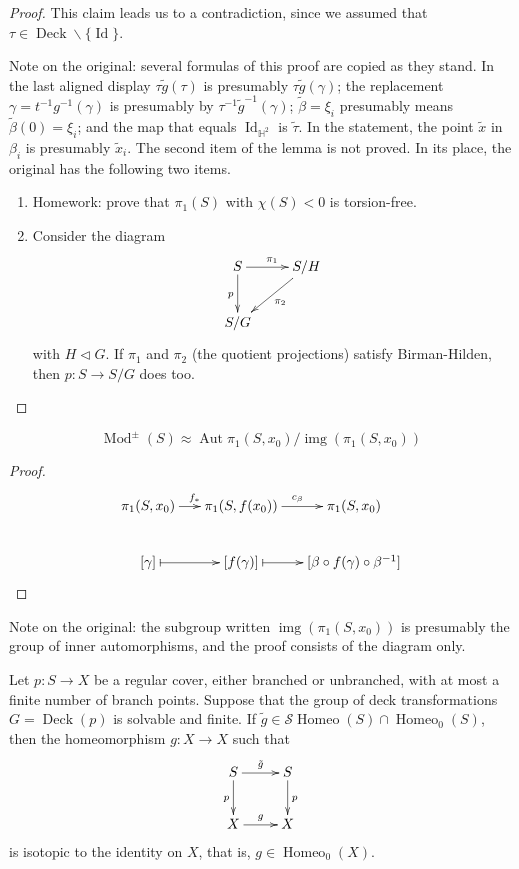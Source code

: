 \begin{proof}
This claim leads us to a contradiction,
since we assumed that
$\tau\in\operatorname{Deck}
\backslash\{\operatorname{Id}\}$.

Note on the original: several formulas
of this proof are copied as they stand.
In the last aligned display
$\tau\tilde{g}(\tau)$ is presumably
$\tau\tilde{g}(\gamma)$; the
replacement
$\gamma=t^{-1}g^{-1}(\gamma)$ is
presumably by
$\tau^{-1}\tilde{g}^{-1}(\gamma)$;
$\tilde{\beta}=\xi_i$ presumably means
$\tilde{\beta}(0)=\xi_i$; and the map
that equals
$\operatorname{Id}_{\mathbb{H}^2}$ is
$\tilde{\tau}$. In the statement, the
point $\tilde{x}$ in $\beta_i$ is
presumably $\tilde{x}_i$. The second
item of the lemma is not proved. In its
place, the original has the following
two items.
\begin{enumerate}
\item Homework: prove that $\pi_1(S)$
with $\chi(S)<0$ is torsion-free.
\item Consider the diagram
$$
\xymatrix{
S \ar[d]_{p} \ar[r]^{\pi_1}
  & S/H \ar[dl]^{\pi_2} \\
S/G
}
$$
with $H\triangleleft G$. If $\pi_1$ and
$\pi_2$ (the quotient projections)
satisfy Birman-Hilden, then
$p:S\to S/G$ does too.
\end{enumerate}
\end{proof}

\begin{theorem}
\label{theorem-dehn-nielsen-baer}
$$
\operatorname{Mod}^\pm(S)\approx
\operatorname{Aut}\pi_1(S,x_0)\Big/
\operatorname{img}(\pi_1(S,x_0))
$$
\end{theorem}

\begin{proof}
$$
\xymatrix@C=1.5em{
\pi_1(S,x_0) \ar[r]^{f_*}
  & \pi_1(S,f(x_0)) \ar[r]^{c_\beta}
  & \pi_1(S,x_0) \\
[\gamma] \ar@{|->}[r]
  & [f(\gamma)] \ar@{|->}[r]
  & [\beta\circ f(\gamma)
    \circ\beta^{-1}]
}
$$
\end{proof}

Note on the original: the subgroup
written
$\operatorname{img}(\pi_1(S,x_0))$ is
presumably the group of inner
automorphisms, and the proof consists
of the diagram only.

\begin{theorem}
\label{theorem-solvable-projects}
Let $p:S\to X$ be a regular cover,
either branched or unbranched, with at
most a finite number of branch points.
Suppose that the group of deck
transformations
$G=\operatorname{Deck}(p)$ is solvable
and finite. If
$\tilde{g}\in
\mathcal{S}\operatorname{Homeo}(S)
\cap\operatorname{Homeo}_0(S)$,
then the homeomorphism $g:X\to X$ such
that
$$
\xymatrix{
S \ar[r]^{\tilde{g}} \ar[d]_{p}
  & S \ar[d]^{p} \\
X \ar[r]^{g} & X
}
$$
is isotopic to the identity on $X$, that
is, $g\in\operatorname{Homeo}_0(X)$.
\end{theorem}

